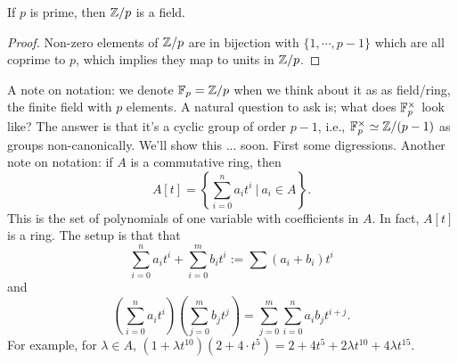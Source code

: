 \begin{cor}
    If $p$ is prime, then $\mathbb{Z} /p$ is a field.
\end{cor}
\begin{proof}
    Non-zero elements of $\mathbb{Z} /p$ are in bijection with $\{1, \cdots ,p-1\} $ which are all coprime to $p$, which implies they map to units in $\mathbb{Z} / p$.
\end{proof}
A note on notation: we denote $\mathbb{F}_p = \mathbb{Z} /p$ when we think about it as as field/ring, the finite field with $p$ elements. A natural question to ask is; what does $\mathbb{F}_p ^{\times }$ look like? The answer is that it's a cyclic group of order $p-1$, i.e., $\mathbb{F}_p ^{\times }\simeq  \mathbb{Z} / (p-1) $ as groups non-canonically. We'll show this ... soon. First some digressions. Another note on notation: if $A$ is a commutative ring, then \[
    A[t] = \left\{ \sum_{i=0}^{n}a_i  t ^i \ \Big| \ a _i  \in A \right\} .
\] This is the set of polynomials of one variable with coefficients in $A$.
In fact, $A[t]$ is a ring. The setup is that that \[
    \sum_{i=0}^{n} a_i t ^i  + \sum_{i=0}^{m} b_i  t ^i  := \sum (a _i  + b _i  ) t ^i 
\] and \[
\left( \sum_{i=0}^{n} a _i  t ^i  \right) \left( \sum_{j=0}^{m} b _j  t ^j  \right) = \sum_{j=0}^{m} \sum_{i=0}^{n} a _i  b _j  t ^{i+j}.
\] For example, for $\lambda \in A$, $(1+ \lambda t ^{10})(2+4 \cdot t^5)  =2+4 t^5+2 \lambda t ^{10}+4 \lambda t ^{15} $.

